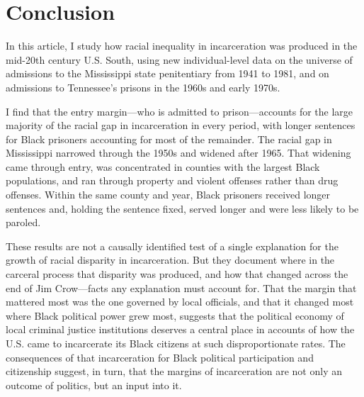 \documentclass[12pt]{article}
\begin{document}
\vspace*{-.1in}
\section*{Conclusion}
\vspace*{-.1in}

\noindent In this article, I study how racial inequality in incarceration was produced in the mid-20th century U.S. South, using new individual-level data on the universe of admissions to the Mississippi state penitentiary from 1941 to 1981, and on admissions to Tennessee's prisons in the 1960s and early 1970s.

I find that the entry margin---who is admitted to prison---accounts for the large majority of the racial gap in incarceration in every period, with longer sentences for Black prisoners accounting for most of the remainder.  The racial gap in Mississippi narrowed through the 1950s and widened after 1965.  That widening came through entry, was concentrated in counties with the largest Black populations, and ran through property and violent offenses rather than drug offenses.  Within the same county and year, Black prisoners received longer sentences and, holding the sentence fixed, served longer and were less likely to be paroled.

These results are not a causally identified test of a single explanation for the growth of racial disparity in incarceration.  But they document where in the carceral process that disparity was produced, and how that changed across the end of Jim Crow---facts any explanation must account for.  That the margin that mattered most was the one governed by local officials, and that it changed most where Black political power grew most, suggests that the political economy of local criminal justice institutions deserves a central place in accounts of how the U.S. came to incarcerate its Black citizens at such disproportionate rates.  The consequences of that incarceration for Black political participation and citizenship \citep{Uggen:2002th,Manza:2008vp,Burch:2014ug,Lerman:2014wr} suggest, in turn, that the margins of incarceration are not only an outcome of politics, but an input into it.
\end{document}
